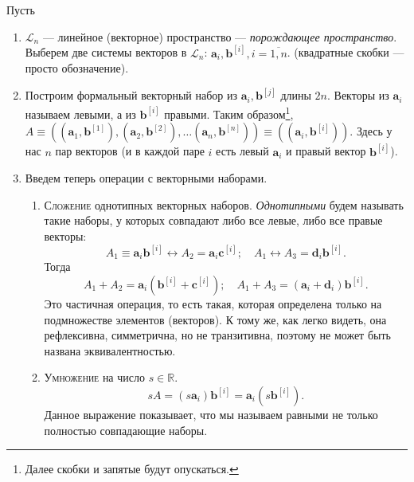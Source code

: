 \renewcommand{\thedefinition}{\ref{tensor-def}$''$}
\addtocounter{definition}{-1}
\begin{definition}[геометрическое]
Пусть
  \begin{enumerate}
    \item $\mathcal{L}_n$ --- линейное (векторное) пространство --- \emph{порождающее пространство}.
      Выберем две системы векторов в $\mathcal{L}_n$: $\mathbf{a}_i, \mathbf{b}^{[i]}, i = \overline{1, n}$.
      (квадратные скобки --- просто обозначение).

    \item Построим формальный векторный набор из $\mathbf{a}_i,
      \mathbf{b}^{[j]}$ длины $2n$.
      Векторы из $\mathbf{a}_i$ называем левыми, а из $\mathbf{b}^{[i]}$
      правыми. Таким образом\footnote{Далее скобки и запятые будут опускаться.}, 
      $A \equiv ((\mathbf{a}_1, \mathbf{b}^{[1]}), (\mathbf{a}_2,
      \mathbf{b}^{[2]}), \dots (\mathbf{a}_n, \mathbf{b}^{[n]}))
      \equiv ((\mathbf{a}_i, \mathbf{b}^{[i]}))$.
      Здесь у нас $ n $ пар векторов (и в каждой паре $ i $ есть левый $\mathbf{a}_i$ и правый вектор
      $\mathbf{b}^{[i]}$).

    \item Введем теперь операции с векторными наборами.
      \begin{enumerate}
        \item \textsc{Сложение} однотипных векторных наборов. \emph{Однотипными} будем называть такие наборы, у 
          которых совпадают либо все левые, либо все правые векторы:
          \[
            A_1 \equiv \mathbf{a}_i \mathbf{b}^{[i]} \leftrightarrow A_2 = \mathbf{a}_i \mathbf{c}^{[i]}; 
            \quad
            A_1 \leftrightarrow A_3 = \mathbf{d}_i \mathbf{b}^{[i]}.
          \]
          Тогда
          \[
            A_1+A_2 = \mathbf{a}_i (\mathbf{b}^{[i]} + \mathbf{c}^{[i]}); \quad
            A_1+A_3 = (\mathbf{a}_i + \mathbf{d}_i) \mathbf{b}^{[i]}.
          \]
          Это частичная операция, то есть такая, которая определена только на
          подмножестве элементов (векторов). К тому же, как легко видеть, она рефлексивна,
          симметрична, но не транзитивна, поэтому не может быть названа
          эквивалентностью.

        \item \textsc{Умножение} на число $s \in \mathbb{R}$.
          \[
            sA = (s \mathbf{a}_i) \mathbf{b}^{[i]} = \mathbf{a}_i (s \mathbf{b}^{[i]}).
          \]
          Данное выражение показывает, что мы называем равными не только
          полностью совпадающие наборы.
        

\end{enumerate}
\end{enumerate}
\end{definition}

